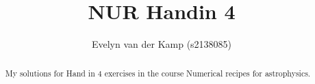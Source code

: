 \documentclass[a4paper,10pt]{article}
\title{NUR Handin 4}
\author{Evelyn van der Kamp (s2138085)}
\begin{document}
\maketitle

\begin{abstract}
 My solutions for Hand in 4 exercises in the 
 course Numerical recipes for astrophysics.
\end{abstract}






\end{document}
